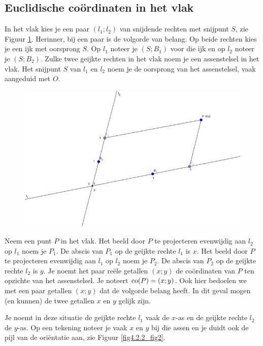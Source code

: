 \subsection{Euclidische co\"ordinaten in het vlak}

In het vlak kies je een paar $(l_1;l_2)$ van snijdende rechten met snijpunt $S$, zie Figuur \ref{fig4.2.2_fig1}.
Herinner, bij een paar is de volgorde van belang.
Op beide rechten kies je een ijk met oorsprong $S$.
Op $l_1$ noteer je $(S;B_1)$ voor die ijk en op $l_2$ noteer je $(S;B_2)$.
Zulke twee geijkte rechten in het vlak noem je een assenstelsel in het vlak.
Het snijpunt $S$ van $l_1$ en $l_2$ noem je de oorsprong van het assenstelsel, vaak aangeduid met $O$.

\begin{figure}[!htb]
\begin{center}
\includegraphics[width=\linewidth]{4_opp_inhoud_an_meetk/inputs/AMTekst2Fig1}
\caption{}
\label{fig4.2.2_fig1}
\end{center}
\end{figure}

Neem een punt $P$ in het vlak.
Het beeld door $P$ te projecteren evenwijdig aan $l_2$ op $l_1$ noem je $P_1$.
De abscis van $P_1$  op de geijkte rechte $l_1$ is $x$.
Het beeld door $P$ te projecteren evenwijdig aan $l_1$ op $l_2$ noem je $P_2$.
De abscis van $P_2$ op de geijkte rechte $l_2$ is $y$.
Je noemt het paar re\"ele getallen $(x;y)$ de co\"ordinaten van $P$ ten opzichte van het assenstelsel.
Je noteert $\operatorname{co} (P)=(x;y)$.
Ook hier bedoelen we met een paar getallen $(x;y)$ dat de volgorde belang heeft.
In dit geval mogen (en kunnen) de twee getallen $x$ en $y$ gelijk zijn.

Je noemt in deze situatie de geijkte rechte $l_1$ vaak de $x$-as en de geijkte rechte $l_2$ de $y$-as.
Op een tekening noteer je vaak $x$ en $y$ bij die assen en je duidt ook de pijl van de ori\"entatie aan, zie Figuur \ref{fig4.2.2_fig2}.

